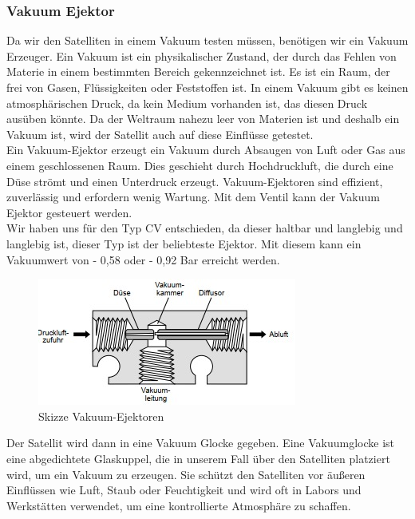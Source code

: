 \subsubsection{Vakuum Ejektor}
Da wir den Satelliten in einem Vakuum testen müssen, benötigen wir ein Vakuum Erzeuger. Ein Vakuum ist ein physikalischer Zustand, der durch das Fehlen von Materie in einem bestimmten Bereich gekennzeichnet ist. Es ist ein Raum, der frei von Gasen, Flüssigkeiten oder Feststoffen ist. In einem Vakuum gibt es keinen atmosphärischen Druck, da kein Medium vorhanden ist, das diesen Druck ausüben könnte. Da der Weltraum nahezu leer von Materien ist und deshalb ein Vakuum ist, wird der Satellit auch auf diese Einflüsse getestet.\\
\vspace{3mm}
Ein Vakuum-Ejektor\autocite{VakuumEjektor} erzeugt ein Vakuum durch Absaugen von Luft oder Gas aus einem geschlossenen Raum. Dies geschieht durch Hochdruckluft, die durch eine Düse strömt und einen Unterdruck erzeugt. Vakuum-Ejektoren sind effizient, zuverlässig und erfordern wenig Wartung. Mit dem Ventil kann der Vakuum Ejektor gesteuert werden.\\
\vspace{3mm}
Wir haben uns für den Typ CV\autocite{VakuumEjektor} entschieden, da dieser haltbar und langlebig und langlebig ist, dieser Typ ist der beliebteste Ejektor.
Mit diesem kann ein Vakuumwert von - 0,58 oder  - 0,92 Bar erreicht werden.
\vspace{3mm}
\begin{figure}[H]
    \centering
    \includegraphics[scale=1.2]{image/vakuumejektor.jpeg}
    \caption{Skizze Vakuum-Ejektoren\autocite{VakuumEjektor}}
    \label{fig:enter-label}
\end{figure}
\vspace{3mm}
Der Satellit wird dann in eine Vakuum Glocke gegeben. Eine Vakuumglocke ist eine abgedichtete Glaskuppel, die in unserem Fall über den Satelliten platziert wird, um ein Vakuum zu erzeugen. Sie schützt den Satelliten vor äußeren Einflüssen wie Luft, Staub oder Feuchtigkeit und wird oft in Labors und Werkstätten verwendet, um eine kontrollierte Atmosphäre zu schaffen.
